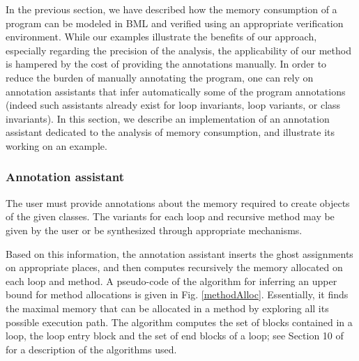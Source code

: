 In the previous section, we have described how the memory consumption
of a program can be modeled in BML and verified using an appropriate
verification environment. While our examples illustrate the benefits
of our approach, especially regarding the precision of the analysis,
the applicability of our method is hampered by the cost of providing
the annotations manually. In order to reduce the burden of manually
annotating the program, one can rely on annotation assistants that
infer automatically some of the program annotations (indeed such
assistants already exist for loop invariants, loop variants, or
class invariants). In this section, we describe an implementation of
an annotation assistant dedicated to the analysis of memory consumption,
and illustrate its working on an example.

\subsubsection{Annotation assistant}
The user must provide annotations about the memory required to create objects of the given classes.
 The variants for each loop and recursive method may be given by the user or be synthesized through appropriate mechanisms.


Based on this information, the annotation assistant 
inserts the ghost assignments on appropriate places, and then computes
recursively the memory allocated on each loop and method. 
A pseudo-code of the algorithm for inferring an upper bound for method allocations is given in Fig. \ref{methodAlloc}.
Essentially, it finds the maximal memory that can be allocated in a method by exploring all its possible execution path.
The algorithm computes the set of blocks contained in a loop, the loop entry block and the set of end blocks of a loop; see Section 10 of 
 \cite{ASU86cpt} for a description of the algorithms used.


